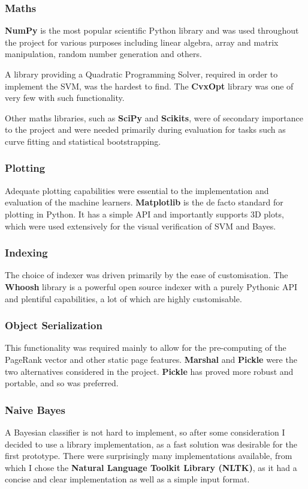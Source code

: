 \documentclass[12pt,notitlepage,twoside]{scrreprt}
\begin{document}
\subsubsection*{Maths}
\textbf{NumPy} is the most popular scientific Python library and was used throughout the
project for various purposes including linear algebra, array and matrix manipulation,
random number generation and others.

A library providing a Quadratic Programming Solver, required in order to implement the
SVM, was the hardest to find. The \textbf{CvxOpt} library was one of very few with such
functionality.

Other maths libraries, such as \textbf{SciPy} and \textbf{Scikits}, were of secondary importance to
the project and were needed primarily during evaluation for tasks such as curve fitting and
statistical bootstrapping.
\subsubsection*{Plotting}
Adequate plotting capabilities were essential to the implementation and evaluation of the
machine learners. \textbf{Matplotlib} is the de facto standard for plotting in Python. It
has a simple API and importantly supports 3D plots, which were used extensively for the visual
verification of SVM and Bayes.
\subsubsection*{Indexing}
The choice of indexer was driven primarily by the ease of customisation. The
\textbf{Whoosh} library is a powerful open source indexer with a purely Pythonic API and
plentiful capabilities, a lot of which are highly
customisable.

\subsubsection*{Object Serialization}
This functionality was required mainly to allow for the pre-computing of the PageRank vector
and other static page features. \textbf{Marshal} and \textbf{Pickle} were the two
alternatives considered in the project. \textbf{Pickle} has proved more robust and
portable, and so was preferred.
\subsubsection*{Naive Bayes}
A Bayesian classifier is not hard to implement, so after some consideration I decided to use a library
implementation, as a fast solution was desirable for the first prototype. There were
surprisingly many implementations available, from which I chose the \textbf{Natural
Language Toolkit Library (NLTK)}, as it had a concise and clear implementation as well as a
simple input format.
\end{document}
